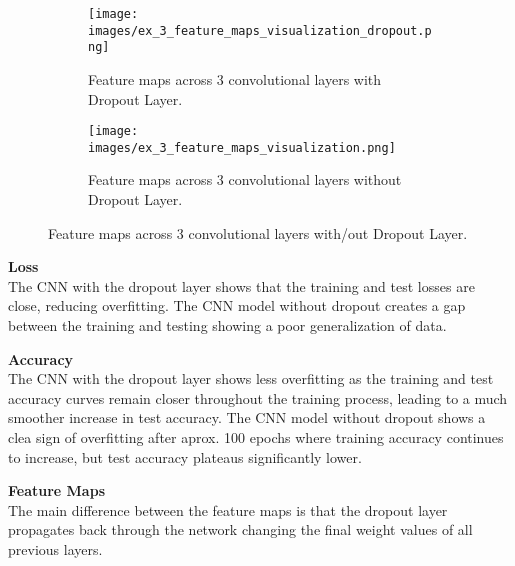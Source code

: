 \begin{figure}[H]
    \centering
    \begin{subfigure}[t]{0.48\textwidth}
        \centering
        \texttt{[image: images/ex\_3\_feature\_maps\_visualization\_dropout.png]}
        \caption{Feature maps across 3 convolutional layers with Dropout Layer.}
    \end{subfigure}
    \hfill
    \begin{subfigure}[t]{0.48\textwidth}
        \centering
        \texttt{[image: images/ex\_3\_feature\_maps\_visualization.png]}
        \caption{Feature maps across 3 convolutional layers without Dropout Layer.}
    \end{subfigure}
    \caption{Feature maps across 3 convolutional layers with/out Dropout Layer.}
\end{figure}

\textbf{Loss}\\
The CNN with the dropout layer shows that the training and test losses are close, reducing overfitting. The CNN model without dropout creates a gap between the training and testing showing a poor generalization of data.

\textbf{Accuracy}\\
The CNN with the dropout layer shows less overfitting as the training and test accuracy curves remain closer throughout the training process, leading to a much smoother increase in test accuracy. The CNN model without dropout shows a clea sign of overfitting after aprox. 100 epochs where training accuracy continues to increase, but test accuracy plateaus significantly lower.

\textbf{Feature Maps}\\
The main difference between the feature maps is that the dropout layer propagates back through the network changing the final weight values of all previous layers.



